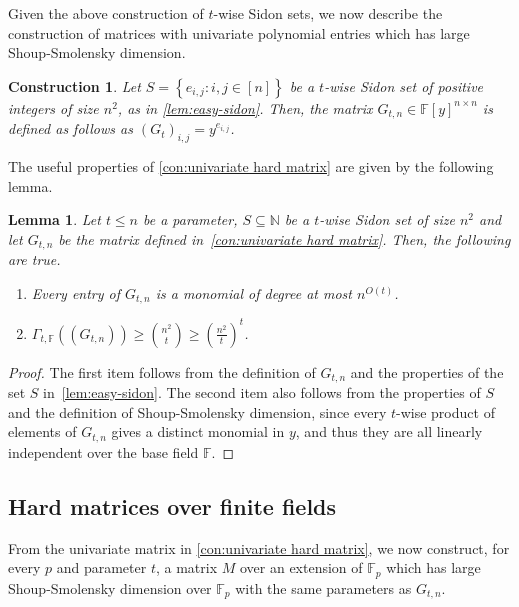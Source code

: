 \documentclass[10pt,a4paper]{article}
\newtheorem{lemma}[theorem]{Lemma}
\newtheorem{construction}[theorem]{Construction}
\newcommand{\F}{\mathbb F}
\newcommand{\N}{\mathbb N}
\newcommand{\set}[1]{\left\{#1\right\}}
\begin{document}
Given the above construction of $t$-wise Sidon sets, we now describe the construction of matrices with univariate polynomial entries which has large Shoup-Smolensky dimension.

\begin{construction}
\label{con:univariate hard matrix}
Let $S = \set{e_{i, j} : i, j \in [n]}$ be a $t$-wise Sidon set of positive integers of size $n^2$, as in \autoref{lem:easy-sidon}. Then, the matrix $G_{t,n} \in \F[y]^{n \times n}$ is defined as follows as 
$(G_t)_{i, j} = y^{e_{i, j}}$.
\end{construction}

The useful properties of \autoref{con:univariate hard matrix} are given by the following lemma.

\begin{lemma}
\label{lem:univariate hard properties}
Let $t \le n$ be a parameter, $S\subseteq\N$ be a $t$-wise Sidon set of size $n^2$ and let $G_{t,n}$ be the matrix defined in~\autoref{con:univariate hard matrix}. Then, the following are true. 
\begin{enumerate}
\item Every entry of $G_{t,n}$ is a monomial of degree at most $n^{O(t)}$. 
\item $\Gamma_{t,\F}((G_{t,n})) \geq \binom{n^2}{t} \ge  \left(\frac{n^2}{t}\right)^t$.
\end{enumerate}
\end{lemma}
\begin{proof}
The first item follows from the definition of $G_{t,n}$ and the properties of the set $S$ in~\autoref{lem:easy-sidon}. The second item also follows from the properties of $S$ and the definition of Shoup-Smolensky dimension, since every $t$-wise product of elements of $G_{t,n}$ gives a distinct monomial in $y$, and thus they are all linearly independent over the base field $\F$.
\end{proof}

\subsection{Hard matrices over finite fields}
From the univariate matrix in \autoref{con:univariate hard matrix}, we  now construct, for every $p$ and parameter $t$, a matrix $M$ over an extension of $\F_p$ which has large Shoup-Smolensky dimension over $\F_p$ with the same parameters as $G_{t,n}$.
 
\end{document}
